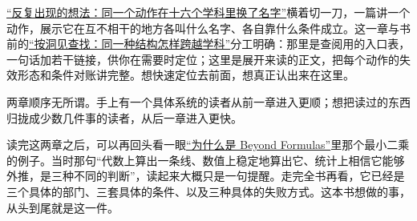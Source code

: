 \hyperref[ch:145]{``反复出现的想法：同一个动作在十六个学科里换了名字''}横着切一刀，一篇讲一个动作，展示它在互不相干的地方各叫什么名字、各自靠什么条件成立。这一章与书前的\hyperref[ch:139]{``按洞见查找：同一种结构怎样跨越学科''}分工明确：那里是查阅用的入口表，一句话加若干链接，供你在需要时定位；这里是展开来读的正文，把每个动作的失效形态和条件对账讲完整。想快速定位去前面，想真正认出来在这里。

两章顺序无所谓。手上有一个具体系统的读者从前一章进入更顺；想把读过的东西归拢成少数几件事的读者，从后一章进入更快。

读完这两章之后，可以再回头看一眼\hyperref[ch:001]{``为什么是 Beyond Formulas''}里那个最小二乘的例子。当时那句``代数上算出一条线、数值上稳定地算出它、统计上相信它能够外推，是三种不同的判断''，读起来大概只是一句提醒。走完全书再看，它已经是三个具体的部门、三套具体的条件、以及三种具体的失败方式。这本书想做的事，从头到尾就是这一件。
